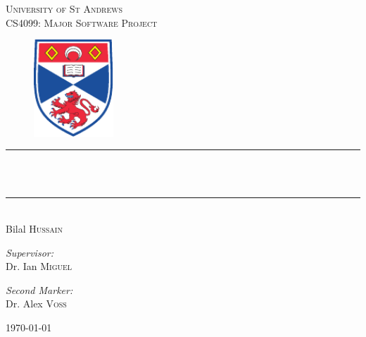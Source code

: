 
\begin{titlepage}
\thispagestyle{empty}
\begin{center}

\textsc{\LARGE University of St Andrews}\\[10pt]
\textsc{\large CS4099: Major Software Project}\\[1cm]

\begin{figure}[h!]
	\centering
	\includegraphics[width=3cm]{settings/logo.pdf}
\end{figure}


\newcommand{\HRule}{\rule{9cm}{0.5mm}}

\HRule\\[10pt]
{ \Huge \bfseries \theTitle }\\
\HRule\\[20pt]
{\LARGE Bilal \textsc{Hussain}}
\vspace{1.5cm}

\begin{minipage}{0.4\textwidth}
\begin{flushleft} \large
\emph{Supervisor:} \\
Dr. Ian  \textsc{Miguel}
\end{flushleft}
\end{minipage}
\begin{minipage}{0.4\textwidth}
\begin{flushright} \large
\emph{Second Marker:} \\
Dr. Alex \textsc{Voss}
\end{flushright}
\end{minipage}

\vfill

{\large \today}
\end{center}
\end{titlepage}